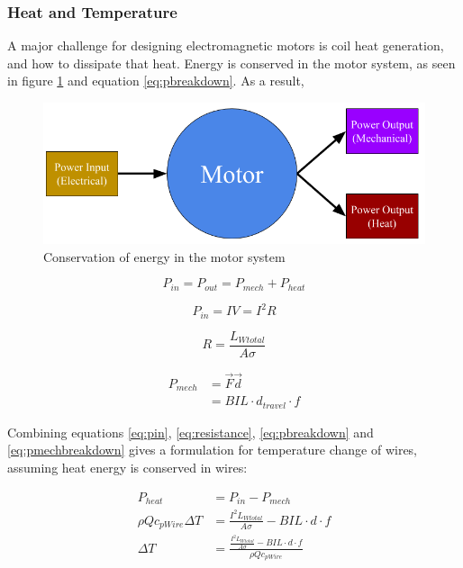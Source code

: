\documentclass[a4paper,12pt]{article}
\begin{document}
\subsubsection{Heat and Temperature}
A major challenge for designing electromagnetic motors is coil heat generation, and how to dissipate that heat. Energy is conserved in the motor system, as seen in figure \ref{fg:motorheat} and equation \ref{eq:pbreakdown}. As a result,  

\begin{figure}[h!]
\centering
\includegraphics[scale=0.4]{motorheat.png}
\caption{Conservation of energy in the motor system}
\label{fg:motorheat}
\end{figure}
\begin{equation}\label{eq:pbreakdown}
P_{in}=P_{out}=P_{mech}+P_{heat}
\end{equation}

\begin{equation}\label{eq:pin}
P_{in} = IV = I^2R
\end{equation}

\begin{equation}\label{eq:resistance}
R=\frac{L_{Wtotal}}{A\sigma}
\end{equation}

\begin{equation}\label{eq:pmechbreakdown}
\begin{split}
P_{mech} & = \vec{F}\vec{d}\\
& = BIL\cdot d_{travel} \cdot f
\end{split}
\end{equation}

Combining equations \ref{eq:pin}, \ref{eq:resistance}, \ref{eq:pbreakdown} and \ref{eq:pmechbreakdown} gives a formulation for temperature change of wires, assuming heat energy is conserved in wires:

\begin{equation}\label{eq:pheatbreakdown}
\begin{split}
P_{heat} & = P_{in}-P_{mech}\\
\rho Q c_{pWire} \Delta T & = \frac{I^2L_{Wtotal}}{A\sigma}-BIL\cdot d \cdot f \\
\Delta T & = \frac{\frac{I^2L_{Wtotal}}{A\sigma}-BIL\cdot d \cdot f}{\rho Q c_{pWire}}
\end{split}
\end{equation}
\end{document}
